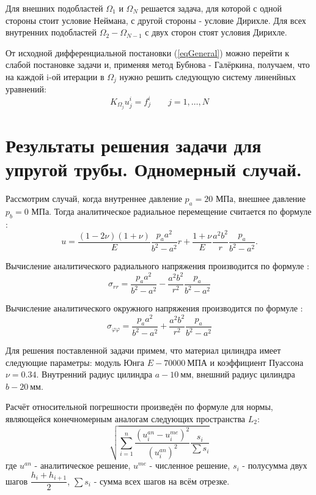 \documentclass[a4paper,14pt]{extarticle}
\begin{document}
Для внешних подобластей $\Omega_1$ и $\Omega_N$ решается задача, для которой с одной стороны стоит условие Неймана, с другой стороны - условие Дирихле. Для всех внутренних подобластей $\Omega_2 - \Omega_{N-1}$ с двух сторон стоят условия Дирихле. 

От исходной дифференциальной постановки (\ref{eqGeneral}) можно перейти к слабой постановке задачи и, применяя метод Бубнова - Галёркина, получаем, что на каждой i-ой итерации в $\Omega_j$ нужно решить следующую систему линенйных уравнений:
\begin{equation}
\textbf{$K_{\Omega_j} u_j^i$}=\textbf{$f_j^i$} \qquad j=1,\ldots,N
\end{equation}

\newpage
\section{Результаты решения задачи для упругой трубы. Одномерный случай.}

Рассмотрим случай, когда внутреннее давление $p_a=20$ МПа, внешнее давление $p_b=0$ МПа. Тогда аналитическое радиальное перемещение считается по формуле :
\begin{equation}\label{perem}
u=\frac{\left(1-2\nu\right)\left(1+\nu\right)}{E} \frac{p_a a^2}{b^2-a^2}r+\frac{1+\nu}{E}\frac{a^2 b^2}{r}\frac{p_a}{b^2-a^2}.
\end{equation}

Вычисление аналитического радиального напряжения производится по формуле :
\begin{equation}
\sigma_{rr}=\frac{p_a a^2}{b^2-a^2}-\frac{a^2 b^2}{r^2}\frac{p_a}{b^2 -a^2}
\end{equation}

Вычисление аналитического окружного напряжения производится по формуле :
\begin{equation}
\sigma_{\varphi\varphi}=\frac{p_a a^2}{b^2-a^2}+\frac{a^2 b^2}{r^2}\frac{p_a}{b^2 -a^2}
\end{equation}	

Для решения поставленной задачи примем, что материал цилиндра имеет следующие параметры: модуль Юнга $E - 70000 \:\text{МПА}$ и коэффициент Пуассона $\nu=0.34$. Внутренний радиус цилиндра $a - 10 \:\text{мм}$, внешний радиус цилиндра $b - 20 \:\text{мм}$.

Расчёт относительной погрешности произведён по формуле для нормы, являющейся конечномерным аналогам следующих пространства $L_2$:
\begin{equation}\label{Error_Ot_L2}
\sqrt{\sum_{i=1}^{n} \dfrac{ (u_i^{an}-u_i^{me})^2}{ (u_i^{an})^2 }\dfrac{s_{i}}{\sum{s_i}}}
\end{equation}
где $u^{an}$ - аналитическое решение, $u^{me}$ - численное решение, $s_i$ - полусумма двух шагов $\dfrac{h_i+h_{i+1}}{2}$, $\sum{s_i}$ - сумма всех шагов на всём отрезке. 
\end{document}

